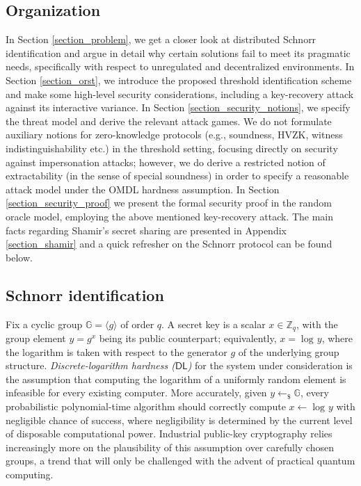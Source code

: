 \documentclass{iacrtrans}
\begin{document}
\subsection{Organization}\label{section_organization}
In Section \ref{section_problem}, we get a closer look
at distributed Schnorr identification
and argue in detail why certain solutions
fail to meet its pragmatic needs,
specifically with respect to
unregulated and decentralized environments.
In Section \ref{section_orst}, we introduce the
proposed threshold identification scheme
and make some high-level security considerations,
including a key-recovery attack against
its interactive variance.
In Section \ref{section_security_notions},
we specify the threat model
and derive the relevant attack games.
We do not formulate auxiliary notions
for zero-knowledge protocols
(e.g., soundness, HVZK,
witness indistinguishability etc.)
in the threshold setting,
focusing directly on security against impersonation attacks;
however, we do derive a restricted notion of extractability
(in the sense of special soundness)
in order to specify a reasonable attack model
under the OMDL hardness assumption.
In Section \ref{section_security_proof} we present
the formal security proof in the random oracle model,
employing the above mentioned key-recovery attack.
The main facts regarding Shamir's secret sharing
are presented in Appendix \ref{section_shamir}
and a quick refresher on the
Schnorr protocol can be found below.

\subsection{Schnorr identification}\label{section_schnorr}

\noindent
Fix a cyclic group $\mathbb{G} = \langle g \rangle$ of order $q$.
A secret key is a scalar $x \in \mathbb{Z}_q$,
with the group element $y = g ^ x$
being its public counterpart;
equivalently, $x = \log\hspace{1pt} y$,
where the logarithm is taken with respect to the
generator $g$ of the underlying group structure.
\textit{Discrete-logarithm hardness \textup{($\mathsf{DL}$)}} for
the system under consideration
is the assumption that computing the logarithm of
a uniformly random element is infeasible
for every existing computer.
More accurately, given $y \leftarrow_\$ \mathbb{G}$,
every probabilistic polynomial-time algorithm
should correctly compute $x \leftarrow \log\hspace{1pt} y$
with negligible chance of success,
where negligibility is determined by
the current level of disposable computational power.
Industrial public-key cryptography relies increasingly more
on the plausibility of this assumption over
carefully chosen groups, a trend that will
only be challenged with the advent of practical quantum computing.
\end{document}
